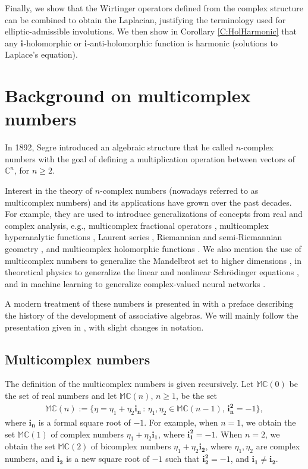\documentclass[12pt]{amsart}
\theoremstyle{plain}
\theoremstyle{definition}
\numberwithin{equation}{section}
\newcommand{\im}[1]{\mathbf{ i_{#1}}}
\newcommand{\ims}[1]{\mathbf{ i_{#1}^2}}
\newcommand{\mC}{\mathbb{C}}
\newcommand{\mM}{\mathbb{M}}
\begin{document}
Finally, we show that the Wirtinger operators defined from the complex structure can be combined to obtain the Laplacian, justifying the terminology used for elliptic-admissible involutions. We then show in Corollary \ref{C:HolHarmonic} that any $\im{}$-holomorphic or $\im{}$-anti-holomorphic function is harmonic (solutions to Laplace's equation). 

\section{Background on multicomplex numbers} \label{S:Multicomplex}
In 1892, Segre \cite{Segre} introduced an algebraic structure that he called $n$-complex numbers with the goal of defining a multiplication operation between vectors of $\mC^n$, for $n \geq 2$. 

Interest in the theory of $n$-complex numbers (nowadays referred to as multicomplex numbers) and its applications have grown over the past decades. For example, they are used to introduce generalizations of concepts from real and complex analysis, e.g., multicomplex fractional operators \cite{Ceballos2022}, multicomplex hyperanalytic functions \cite{vajiac}, Laurent series \cite{Luna2017}, Riemannian and semi-Riemannian geometry \cite{vajiac2018}, and multicomplex holomorphic functions \cite{Struppa2012}. We also mention the use of multicomplex numbers to generalize the Mandelbrot set to higher dimensions \cite{Parise2019, BrouilletteRochon2019, Pelletier2009, Rochon1}, in theoretical physics to generalize the linear and nonlinear {S}chr\"{o}dinger equations \cite{RochonTremblay2004, Theaker2017}, and in machine learning to generalize complex-valued neural networks  \cite{AlpayDikiVajiac2023}.

A modern treatment of these numbers is presented in \cite{Baley} with a preface describing the history of the development of associative algebras.  We will mainly follow the presentation given in \cite{BrouilletteRochon2019}, with slight changes in notation.

\subsection{Multicomplex numbers}
The definition of the multicomplex numbers is given recursively. Let $\mM \mC(0)$ be the set of real numbers and let $\mM \mC(n)$, $n \geq 1$, be the set
    \begin{align}
        \mM \mC(n) := \{ \eta = \eta_1 + \eta_2 \im{n}\, :\, \eta_1 , \eta_2 \in \mM \mC(n- 1 ) ,\, \ims{n} = -1 \},
    \end{align}
where $\im{n}$ is a formal square root of $-1$. For example, when $n = 1$, we obtain the set $\mM \mC(1)$ of complex numbers $\eta_1 + \eta_2 \im{1}$, where $\ims{1} = -1$. When $n = 2$, we obtain the set $\mM \mC(2)$ of bicomplex numbers $\eta_1 + \eta_2 \im{2}$, where $\eta_1 , \eta_2$ are complex numbers, and $\im{2}$ is a new square root of $-1$ such that $\ims{2} = -1$, and $\im{1} \neq \im{2}$. 
\end{document}
